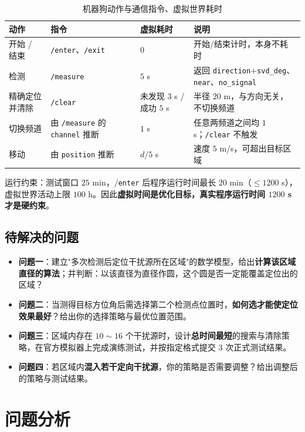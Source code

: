 \documentclass[11pt,a4paper]{ctexart}
\begin{document}
\begin{table}[H]
\centering
\caption{机器狗动作与通信指令、虚拟世界耗时}
\label{tab:actions}
\footnotesize
\setlength{\tabcolsep}{4pt}
\begin{tabular}{@{}lll >{\raggedright\arraybackslash}p{4.5cm}@{}}
\toprule
动作 & 指令 & 虚拟耗时 & 说明 \\
\midrule
开始 / 结束 & \texttt{/enter}、\texttt{/exit} & $0$ & 开始/结束计时，本身不耗时 \\
检测 & \texttt{/measure} & $5$ s & 返回 \texttt{direction}$+$\texttt{svd\_deg}、\texttt{near}、\texttt{no\_signal} \\
精确定位并清除 & \texttt{/clear} & 未发现 $3$ s / 成功 $5$ s & 半径 $20$ m，与方向无关，不切换频道 \\
切换频道 & 由 \texttt{/measure} 的 \texttt{channel} 推断 & $1$ s & 任意两频道之间均 $1$ s；\texttt{/clear} 不触发 \\
移动 & 由 \texttt{position} 推断 & $d/5$ s & 速度 $5$ m/s，可超出目标区域 \\
\bottomrule
\end{tabular}
\end{table}

运行约束：测试窗口 $25$ min，$/$\texttt{enter} 后程序运行时间最长 $20$ min（$\le 1200$ s），虚拟世界活动上限 $100$ h。因此\textbf{虚拟时间是优化目标，真实程序运行时间 $1200$ s 才是硬约束}。

\subsection{待解决的问题}

\begin{itemize}
  \item \textbf{问题一}：建立"多次检测后定位干扰源所在区域"的数学模型，给出\textbf{计算该区域直径的算法}；并判断：以该直径为直径作圆，这个圆是否一定能覆盖定位出的区域？
  \item \textbf{问题二}：当测得目标方位角后需选择第二个检测点位置时，\textbf{如何选才能使定位效果最好}？给出你的选择策略与最优位置范围。
  \item \textbf{问题三}：区域内存在 $10\!\sim\!16$ 个干扰源时，设计\textbf{总时间最短}的搜索与清除策略，在官方模拟器上完成演练测试，并按指定格式提交 $3$ 次正式测试结果。
  \item \textbf{问题四}：若区域内\textbf{混入若干定向干扰源}，你的策略是否需要调整？给出调整后的策略与测试结果。
\end{itemize}

\section{问题分析}
\end{document}
